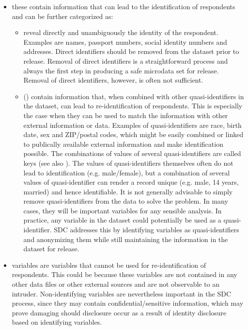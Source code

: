\documentclass[letterpaper,10pt,english]{sphinxmanual}
\begin{document}
\begin{itemize}
\item {} 
 these contain information that can lead to
the identification of respondents and can be further categorized as:
\begin{itemize}
\item {} 
 reveal directly and unambiguously the
identity of the respondent. Examples are names, passport numbers,
social identity numbers and addresses. Direct identifiers should
be removed from the dataset prior to release. Removal of direct
identifiers is a straightforward process and always the first step
in producing a safe microdata set for release. Removal of direct
identifiers, however, is often not sufficient.

\item {} 
 () contain information
that, when combined with other quasi-identifiers in the dataset,
can lead to re-identification of respondents. This is especially
the case when they can be used to match the information with other
external information or data. Examples of quasi-identifiers are
race, birth date, sex and ZIP/postal codes, which might be easily
combined or linked to publically available external information
and make identification possible. The combinations of values of
several quasi-identifiers are called keys (see also {\hyperref[\detokenize{measure_risk:levels-of-risk}]{}}).
The values of quasi-identifiers themselves often do not lead to
identification (e.g. male/female), but a combination of several
values of quasi-identifier can render a record unique (e.g. male,
14 years, married) and hence identifiable. It is not generally
advisable to simply remove quasi-identifiers from the data to
solve the problem. In many cases, they will be important variables
for any sensible analysis. In practice, any variable in the
dataset could potentially be used as a quasi-identifier. SDC
addresses this by identifying variables as quasi-identifiers and
anonymizing them while still maintaining the information in the
dataset for release.

\end{itemize}

\item {} 
 variables are variables that cannot be used for
re-identification of respondents. This could be because these
variables are not contained in any other data files or other external
sources and are not observable to an intruder. Non-identifying
variables are nevertheless important in the SDC process, since they
may contain confidential/sensitive information, which may prove
damaging should disclosure occur as a result of identity disclosure
based on identifying variables.


\end{itemize}
\end{document}
